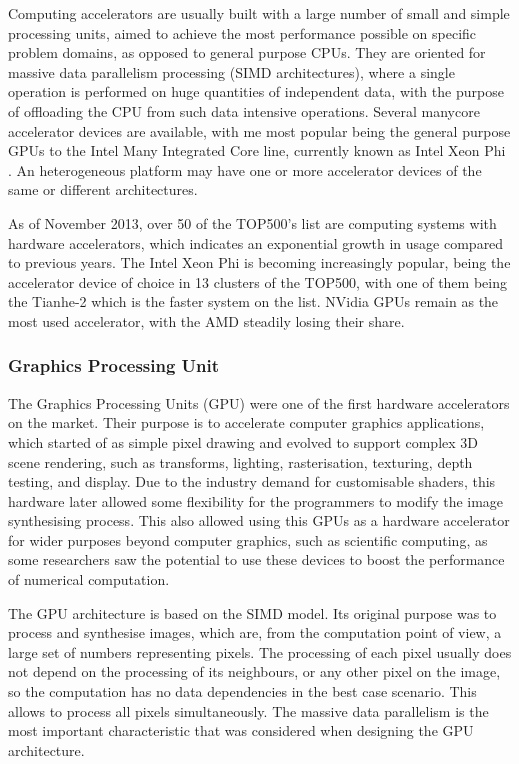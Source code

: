 Computing accelerators are usually built with a large number of small and simple processing units, aimed to achieve the most performance possible on specific problem domains, as opposed to general purpose CPUs. They are oriented for massive data parallelism processing (SIMD architectures), where a single operation is performed on huge quantities of independent data, with the purpose of offloading the CPU from such data intensive operations. Several manycore accelerator devices are available, with me most popular being the general purpose GPUs to the Intel Many Integrated Core line, currently known as Intel Xeon Phi \cite{Intel:MIC}. An heterogeneous platform may have one or more accelerator devices of the same or different architectures.

As of November 2013, over 50 of the TOP500’s list \cite{TOP500} are computing systems with hardware accelerators, which indicates an exponential growth in usage compared to previous years. The Intel Xeon Phi is becoming increasingly popular, being the accelerator device of choice in 13 clusters of the TOP500, with one of them being the Tianhe-2 which is the faster system on the list. NVidia GPUs remain as the most used accelerator, with the AMD steadily losing their share.

\subsubsection*{Graphics Processing Unit}
\label{gpu}

The Graphics Processing Units (GPU) were one of the first hardware accelerators on the market. Their purpose is to accelerate computer graphics applications, which started of as simple pixel drawing and evolved to support complex 3D scene rendering, such as transforms, lighting, rasterisation, texturing, depth testing, and display. Due to the industry demand for customisable shaders, this hardware later allowed some flexibility for the programmers to modify the image synthesising process. This also allowed using this GPUs as a hardware accelerator for wider purposes beyond computer graphics, such as scientific computing, as some researchers saw the potential to use these devices to boost the performance of numerical computation.

The GPU architecture is based on the SIMD model. Its original purpose was to process and synthesise images, which are, from the computation point of view, a large set of numbers representing pixels. The processing of each pixel usually does not depend on the processing of its neighbours, or any other pixel on the image, so the computation has no data dependencies in the best case scenario. This allows to process all pixels simultaneously. The massive data parallelism is the most important characteristic that was considered when designing the GPU architecture.

